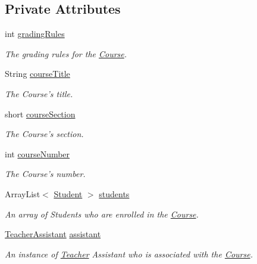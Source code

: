 \subsection*{Private Attributes}
\begin{CompactItemize}
\item 
int \hyperlink{classCourse_98c195c6fb24d3516cce208d316cfea7}{gradingRules}
\begin{CompactList}\small\item\em The grading rules for the \hyperlink{classCourse}{Course}. \item\end{CompactList}\item 
String \hyperlink{classCourse_b5d0d78500c3a2ac7e3119e492e84c43}{courseTitle}
\begin{CompactList}\small\item\em The Course's title. \item\end{CompactList}\item 
short \hyperlink{classCourse_3c691a1d87018604cc97964dd1d23969}{courseSection}
\begin{CompactList}\small\item\em The Course's section. \item\end{CompactList}\item 
int \hyperlink{classCourse_d80c00a2eb9c442c923701341091c041}{courseNumber}
\begin{CompactList}\small\item\em The Course's number. \item\end{CompactList}\item 
ArrayList$<$ \hyperlink{classStudent}{Student} $>$ \hyperlink{classCourse_4c9b5c99514f93acca32bfc5b59056a0}{students}
\begin{CompactList}\small\item\em An array of Students who are enrolled in the \hyperlink{classCourse}{Course}. \item\end{CompactList}\item 
\hyperlink{classTeacherAssistant}{TeacherAssistant} \hyperlink{classCourse_1a4e0b8a02c292d708ea189a3ec630ac}{assistant}
\begin{CompactList}\small\item\em An instance of \hyperlink{classTeacher}{Teacher} Assistant who is associated with the \hyperlink{classCourse}{Course}. \item\end{CompactList}\item 

\end{CompactItemize}
